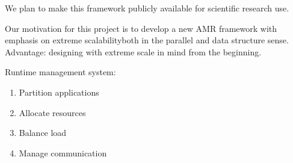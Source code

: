 \documentclass[14pt,letter]{article}
\begin{document}
We plan to make this framework publicly available for scientific research use.

Our motivation for this project is to develop a new AMR framework with emphasis on extreme scalabilityboth in the parallel and data structure sense.
Advantage: designing with extreme scale in mind from the beginning.



Runtime management system:
\begin{enumerate}
\item Partition applications
\item Allocate resources
\item Balance load
\item Manage communication
\end{enumerate}
% 
\end{document}
